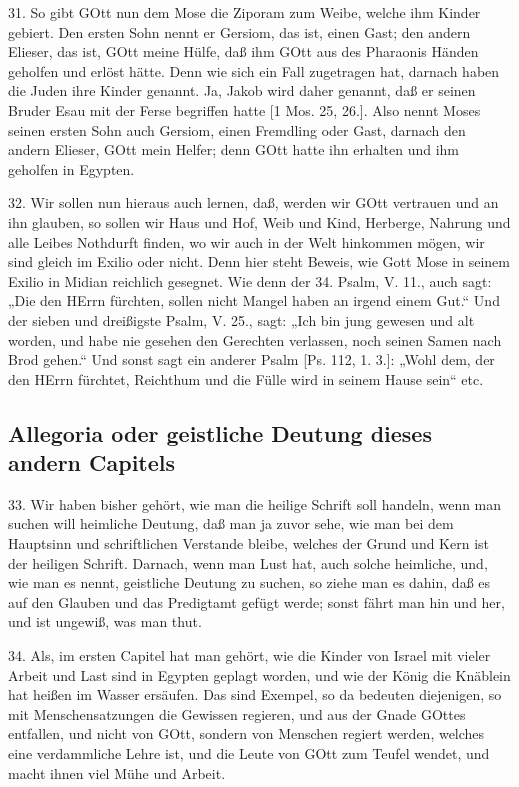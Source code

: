 31. So gibt GOtt nun dem Mose die Ziporam zum Weibe, welche ihm Kinder gebiert. Den ersten Sohn nennt er Gersiom, das ist, einen Gast; den andern Elieser, das ist, GOtt meine Hülfe, daß ihm GOtt aus des Pharaonis Händen geholfen und erlöst hätte. Denn wie sich ein Fall zugetragen hat, darnach haben die Juden ihre Kinder genannt. Ja, Jakob wird daher genannt, daß er seinen Bruder Esau mit der Ferse begriffen hatte [1 Mos. 25, 26.]. Also nennt Moses seinen ersten Sohn auch Gersiom, einen Fremdling oder Gast, darnach den andern Elieser, GOtt mein Helfer; denn GOtt hatte ihn erhalten und ihm geholfen in Egypten.

32. Wir sollen nun hieraus auch lernen, daß, werden wir GOtt vertrauen und an ihn glauben, so sollen wir Haus und Hof, Weib und Kind, Herberge, Nahrung und alle Leibes Nothdurft finden, wo wir auch in der Welt hinkommen mögen, wir sind gleich im Exilio oder nicht. Denn hier steht Beweis, wie Gott Mose in seinem Exilio in Midian reichlich gesegnet. Wie denn der 34. Psalm, V. 11., auch sagt: „Die den HErrn fürchten, sollen nicht Mangel haben an irgend einem Gut.“ Und der sieben und dreißigste Psalm, V. 25., sagt: „Ich bin jung gewesen und alt worden, und habe nie gesehen den Gerechten verlassen, noch seinen Samen nach Brod gehen.“ Und sonst sagt ein anderer Psalm [Ps. 112, 1. 3.]: „Wohl dem, der den HErrn fürchtet, Reichthum und die Fülle wird in seinem Hause sein“ etc.

\subsection{Allegoria oder geistliche Deutung dieses andern Capitels}

33. Wir haben bisher gehört, wie man die heilige Schrift soll handeln, wenn man suchen will heimliche Deutung, daß man ja zuvor sehe, wie man bei dem Hauptsinn und schriftlichen Verstande bleibe, welches der Grund und Kern ist der heiligen Schrift. Darnach, wenn man Lust hat, auch solche heimliche, und, wie man es nennt, geistliche Deutung zu suchen, so ziehe man es dahin, daß es auf den Glauben und das Predigtamt gefügt werde; sonst fährt man hin und her, und ist ungewiß, was man thut.

34. Als, im ersten Capitel hat man gehört, wie die Kinder von Israel mit vieler Arbeit und Last sind in Egypten geplagt worden, und wie der König die Knäblein hat heißen im Wasser ersäufen. Das sind Exempel, so da bedeuten diejenigen, so mit Menschensatzungen die Gewissen regieren, und aus der Gnade GOttes entfallen, und nicht von GOtt, sondern von Menschen regiert werden, welches eine verdammliche Lehre ist, und die Leute von GOtt zum Teufel wendet, und macht ihnen viel Mühe und Arbeit.

